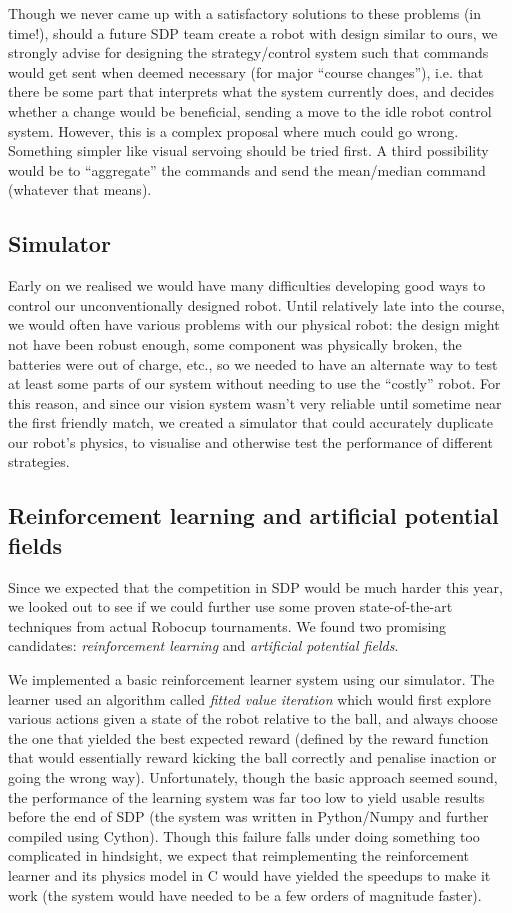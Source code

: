 \documentclass[12pt,a4paper,notitlepage,twocolumn]{report}
\begin{document}
Though we never came up with a satisfactory solutions to these
problems (in time!), should a future SDP team create a robot with
design similar to ours, we strongly advise for designing the
strategy/control system such that commands would get sent when deemed
necessary (for major “course changes”), i.e. that there be some part
that interprets what the system currently does, and decides whether a
change would be beneficial, sending a move to the idle robot control
system. However, this is a complex proposal where much could go wrong.
Something simpler like visual servoing should be tried first. A third
possibility would be to “aggregate” the commands and send the
mean/median command (whatever that means).

\subsection*{Simulator}
Early on we realised we would have many difficulties developing good
ways to control our unconventionally designed robot. Until relatively
late into the course, we would often have various problems with our
physical robot: the design might not have been robust enough, some
component was physically broken, the batteries were out of charge,
etc., so we needed to have an alternate way to test at least some
parts of our system without needing to use the “costly” robot. For
this reason, and since our vision system wasn’t very reliable until
sometime near the first friendly match, we created a simulator that
could accurately duplicate our robot’s physics, to visualise and
otherwise test the performance of different strategies.


\subsection*{Reinforcement learning and artificial potential fields}
Since we expected that the competition in SDP would be much harder
this year, we looked out to see if we could further use some proven
state-of-the-art techniques from actual Robocup tournaments. We found
two promising candidates: \emph{reinforcement learning} and
\emph{artificial potential fields}.

We implemented a basic reinforcement learner system using our
simulator. The learner used an algorithm called \emph{fitted value iteration}
which would first explore various actions given a state of the robot
relative to the ball, and always choose the one that yielded the best
expected reward (defined by the reward function that would essentially
reward kicking the ball correctly and penalise inaction or going the
wrong way). Unfortunately, though the basic approach seemed sound, the
performance of the learning system was far too low to yield usable
results before the end of SDP (the system was written in Python/Numpy
and further compiled using Cython). Though this failure falls under
doing something too complicated in hindsight, we expect that
reimplementing the reinforcement learner and its physics model in C
would have yielded the speedups to make it work (the system would have
needed to be a few orders of magnitude faster).
\end{document}
